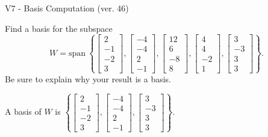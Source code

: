 \begin{exercise}
  \begin{exerciseTitle}V7 - Basis Computation (ver. 46)\end{exerciseTitle}
  \begin{exerciseStatement}
    Find a basis for the subspace 
\[W=\mathrm{span}\ \left\{\left[\begin{array}{r}
2 \\
-1 \\
-2 \\
3
\end{array}\right] , \left[\begin{array}{r}
-4 \\
-4 \\
2 \\
-1
\end{array}\right] , \left[\begin{array}{r}
12 \\
6 \\
-8 \\
8
\end{array}\right] , \left[\begin{array}{r}
4 \\
4 \\
-2 \\
1
\end{array}\right] , \left[\begin{array}{r}
3 \\
-3 \\
3 \\
3
\end{array}\right]\right\}.\]
 Be sure to explain why your result is a basis.


  \end{exerciseStatement}
  \begin{exerciseAnswer}
   A basis of \(W\) is  \(\left\{\left[\begin{array}{r}
2 \\
-1 \\
-2 \\
3
\end{array}\right] , \left[\begin{array}{r}
-4 \\
-4 \\
2 \\
-1
\end{array}\right] , \left[\begin{array}{r}
3 \\
-3 \\
3 \\
3
\end{array}\right]\right\}\).
  


  \end{exerciseAnswer}
\end{exercise}